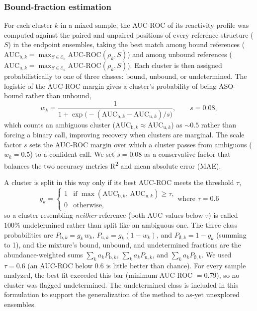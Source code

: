 \documentclass[unnumsec,webpdf,contemporary,large]{oup-authoring-template}%
\theoremstyle{thmstyleone}%
\theoremstyle{thmstyletwo}%
\theoremstyle{thmstylethree}%
\begin{document}
\subsubsection{Bound-fraction estimation}
\label{bound-fraction-estimation}
For each cluster $k$ in a mixed sample, the AUC-ROC of its reactivity profile was computed against the paired and unpaired positions of every reference structure ($S$) in the endpoint ensembles, taking the best match among bound references ($\mathrm{AUC}_{\mathrm{b},k} = \max_{S \in \mathcal{E}_{\mathrm{b}}} \text{AUC-ROC}(\rho_k, S)$) and among unbound references ($\mathrm{AUC}_{\mathrm{u},k} = \max_{S \in \mathcal{E}_{\mathrm{u}}} \text{AUC-ROC}(\rho_k, S)$). Each cluster is then assigned probabilistically to one of three classes: bound, unbound, or undetermined. The logistic of the AUC-ROC margin gives a cluster's probability of being ASO-bound rather than unbound,
\begin{equation}
w_k = \frac{1}{1 + \exp\!\big(-(\mathrm{AUC}_{\mathrm{b},k} - \mathrm{AUC}_{\mathrm{u},k})/s\big)}, \qquad s = 0.08,
\end{equation}
which counts an ambiguous cluster ($\mathrm{AUC}_{\mathrm{b},k} \approx \mathrm{AUC}_{\mathrm{u},k}$) as ${\sim}0.5$ rather than forcing a binary call, improving recovery when clusters are marginal. The scale factor $s$ sets the AUC-ROC margin over which a cluster passes from ambiguous ($w_k = 0.5$) to a confident call. We set $s = 0.08$ as a conservative factor that balances the two accuracy metrics R\textsuperscript{2} and mean absolute error (MAE).

A cluster is split in this way only if its best AUC-ROC meets the threshold $\tau$,
\begin{equation}
g_k=\begin{cases}1 & \text{if } \max(\mathrm{AUC}_{\mathrm{b},k},\,\mathrm{AUC}_{\mathrm{u},k})\ge\tau,\\[2pt] 0 & \text{otherwise,}\end{cases}
\text{where } \tau = 0.6
\end{equation}
so a cluster resembling \emph{neither} reference (both AUC values below $\tau$) is called $100\%$ undetermined rather than split like an ambiguous one. The three class probabilities are $P_{\mathrm{b},k}=g_k\,w_k$, $P_{\mathrm{u},k}=g_k(1-w_k)$, and $P_{\emptyset,k}=1-g_k$ (summing to 1), and the mixture's bound, unbound, and undetermined fractions are the abundance-weighted sums $\sum_k a_k P_{\mathrm{b},k}$, $\sum_k a_k P_{\mathrm{u},k}$, and $\sum_k a_k P_{\emptyset,k}$. We used $\tau=0.6$ (an AUC-ROC below $0.6$ is little better than chance). For every sample analyzed, the best fit exceeded this bar (minimum AUC-ROC $= 0.79$), so no cluster was flagged undetermined. The undetermined class is included in this formulation to support the generalization of the method to as-yet unexplored ensembles.
\end{document}
